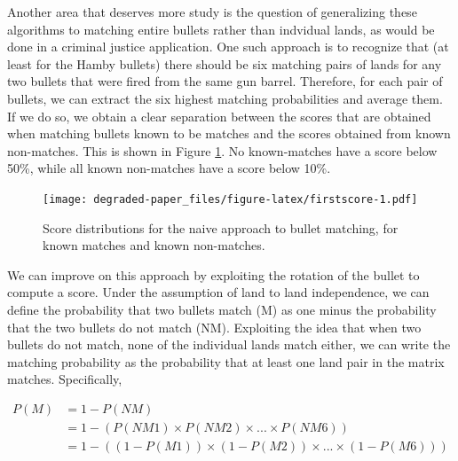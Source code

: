 \documentclass[12pt,]{article}
\theoremstyle{definition}
\theoremstyle{definition}
\theoremstyle{definition}
\theoremstyle{remark}
\begin{document}
Another area that deserves more study is the question of generalizing
these algorithms to matching entire bullets rather than indvidual lands,
as would be done in a criminal justice application. One such approach is
to recognize that (at least for the Hamby bullets) there should be six
matching pairs of lands for any two bullets that were fired from the
same gun barrel. Therefore, for each pair of bullets, we can extract the
six highest matching probabilities and average them. If we do so, we
obtain a clear separation between the scores that are obtained when
matching bullets known to be matches and the scores obtained from known
non-matches. This is shown in Figure \ref{fig:firstscore}. No
known-matches have a score below 50\%, while all known non-matches have
a score below 10\%.

\begin{figure}[htbp]
\centering
\texttt{[image: degraded-paper\_files/figure-latex/firstscore-1.pdf]}
\caption{\label{fig:firstscore}Score distributions for the naive approach to
bullet matching, for known matches and known non-matches.}
\end{figure}

We can improve on this approach by exploiting the rotation of the bullet
to compute a score. Under the assumption of land to land independence,
we can define the probability that two bullets match (M) as one minus
the probability that the two bullets do not match (NM). Exploiting the
idea that when two bullets do not match, none of the individual lands
match either, we can write the matching probability as the probability
that at least one land pair in the matrix matches. Specifically,

\begin{align*}
P(M) &= 1 - P(NM) \\
     &= 1 - (P(NM1) \times P(NM2) \times ... \times P(NM6)) \\
     &= 1 - ((1 - P(M1)) \times (1 - P(M2)) \times ... \times (1 - P(M6)))
\end{align*}
\end{document}
